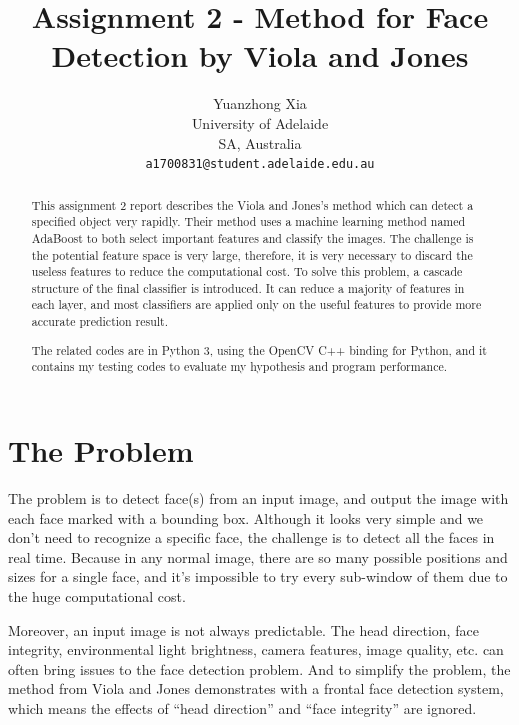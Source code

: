 \documentclass[10pt,twocolumn,letterpaper]{article}
\begin{document}
\title{Assignment 2 - Method for Face Detection by Viola and Jones}
\author{Yuanzhong Xia\\
University of Adelaide\\
SA, Australia\\
{\tt\small a1700831@student.adelaide.edu.au}
}
\maketitle

\begin{abstract}
This assignment 2 report describes the Viola and Jones's method \cite{origin} which can detect a specified object very rapidly.
Their method uses a machine learning method named AdaBoost \cite{adaboost} to both select important features and classify the images.
The challenge is the potential feature space is very large, therefore, it is very necessary to discard the useless features to reduce the computational cost.
To solve this problem, a cascade structure of the final classifier is introduced. It can reduce a majority of features in each layer,
and most classifiers are applied only on the useful features to provide more accurate prediction result.

The related codes are in Python 3, using the OpenCV C++ binding for Python,
and it contains my testing codes to evaluate my hypothesis and program performance.
\end{abstract}


\section{The Problem}
The problem is to detect face(s) from an input image, and output the image with each face marked with a bounding box.
Although it looks very simple and we don't need to recognize a specific face, the challenge is to detect all the faces in real time.
Because in any normal image, there are so many possible positions and sizes for a single face,
and it's impossible to try every sub-window of them due to the huge computational cost.

Moreover, an input image is not always predictable. The head direction, face integrity, environmental light brightness,
camera features, image quality, etc. can often bring issues to the face detection problem.
And to simplify the problem, the method from Viola and Jones demonstrates with a frontal face detection system,
which means the effects of ``head direction'' and ``face integrity'' are ignored.
\end{document}
